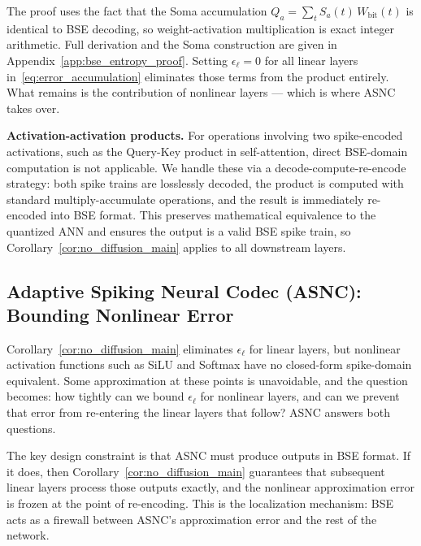 \documentclass{article}
\theoremstyle{plain}
\theoremstyle{definition}
\theoremstyle{remark}
\begin{document}
The proof uses the fact that the Soma accumulation $Q_a = \sum_t S_a(t)\,
W_{\mathrm{bit}}(t)$ is identical to BSE decoding, so weight-activation
multiplication is exact integer arithmetic. Full derivation and the Soma construction
are given in Appendix~\ref{app:bse_entropy_proof}. Setting $\epsilon_\ell = 0$ for
all linear layers in~\eqref{eq:error_accumulation} eliminates those terms from the
product entirely. What remains is the contribution of nonlinear layers — which is
where ASNC takes over.

\noindent\textbf{Activation-activation products.} For operations involving two spike-encoded activations, such as the Query-Key product in self-attention, direct BSE-domain computation is not applicable. We handle these via a decode-compute-re-encode strategy: both spike trains are losslessly decoded, the product is computed with standard multiply-accumulate operations, and the result is immediately re-encoded into BSE format. This preserves mathematical equivalence to the quantized ANN and ensures the output is a valid BSE spike train, so Corollary~\ref{cor:no_diffusion_main} applies to all downstream layers.

\subsection{Adaptive Spiking Neural Codec (ASNC): Bounding Nonlinear Error}
\label{subsec:asnc}

Corollary~\ref{cor:no_diffusion_main} eliminates $\epsilon_\ell$ for linear layers,
but nonlinear activation functions such as SiLU and Softmax have no closed-form
spike-domain equivalent. Some approximation at these points is unavoidable, and the
question becomes: how tightly can we bound $\epsilon_\ell$ for nonlinear layers, and
can we prevent that error from re-entering the linear layers that follow? ASNC answers
both questions.

The key design constraint is that ASNC must produce outputs in BSE format. If it
does, then Corollary~\ref{cor:no_diffusion_main} guarantees that subsequent linear
layers process those outputs exactly, and the nonlinear approximation error is frozen
at the point of re-encoding. This is the localization mechanism: BSE acts as a
firewall between ASNC's approximation error and the rest of the network.
\end{document}

